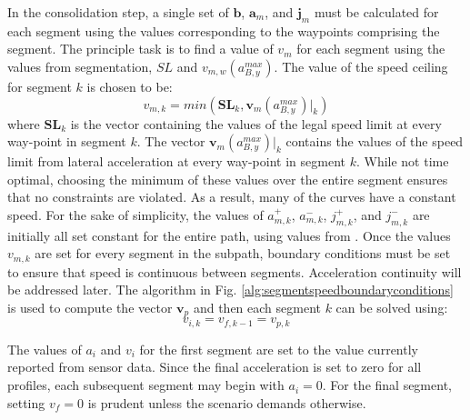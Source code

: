 \documentclass[letterpaper, 10 pt, conference]{ieeeconf}  %
\begin{document}
In the consolidation step, a single set of $\mathbf{b}$, $\mathbf{a}_m$, and $\mathbf{j}_m$ 
must be calculated for each segment using the values corresponding to the waypoints comprising the segment.
The principle task is to find a value of $v_m$ for each segment using the values from segmentation, $SL$ and $v_{m,w}(a_{B,y}^{max})$. 
The value of the speed ceiling for segment $k$ is chosen to be:
\begin{equation}
  v_{m,k} = min \left ( \mathbf{SL}_k ,  \mathbf{v}_{m}(a_{B,y}^{max}) |_k \right )
\end{equation}
where $\mathbf{SL}_k$ is the vector containing the values of the legal speed limit at every way-point in segment $k$.
The vector $\mathbf{v}_{m}(a_{B,y}^{max}) |_k$ contains the values of the speed limit from lateral acceleration at every way-point in segment $k$.
While not time optimal, choosing the minimum of these values over the entire segment ensures that no constraints are violated. As a result, many of the curves have a constant speed.
For the sake of simplicity, the values of $a^+_{m,k}$, $a^-_{m,k}$, $j^+_{m,k}$, and $j^-_{m,k}$ are initially all set constant for the entire path, using values from \cite{Maurya2012,Hoberock1977,Long2000}.
Once the values $v_{m,k}$ are set for every segment in the subpath, boundary conditions must be set to ensure that speed is continuous between segments. Acceleration continuity will be addressed later.
The algorithm in Fig. \ref{alg:segmentspeedboundaryconditions} is used to compute the vector $\mathbf{v}_p$ and then each segment $k$ can be solved using:
\begin{equation}
  v_{i,k} = v_{f,k-1} = v_{p,k}
\end{equation}

The values of $a_i$ and $v_i$ for the first segment are set to the value currently reported from sensor data.
Since the final acceleration is set to zero for all profiles, each subsequent segment may begin with $a_i = 0$.
For the final segment, setting $v_f = 0$ is prudent unless the scenario demands otherwise.
\end{document}
